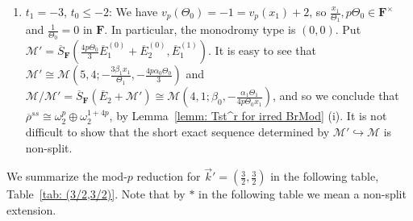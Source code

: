 \documentclass[11pt]{amsart}
\theoremstyle{definition}
\numberwithin{equation}{subsection}
\theoremstyle{plain}
\theoremstyle{plain}
\theoremstyle{plain}
\theoremstyle{plain}
\theoremstyle{plain}
\theoremstyle{plain}
\theoremstyle{plain}
\theoremstyle{plain}
\theoremstyle{plain}
\theoremstyle{plain}
\theoremstyle{plain}
\theoremstyle{plain}
\theoremstyle{definition}
\theoremstyle{definition}
\theoremstyle{definition}
\theoremstyle{remark}
\renewcommand{\(}{\textup{(}}
\renewcommand{\)}{\textup{)}}
\newcommand{\Q}{\mathbf{Q}}
\newcommand{\F}{\mathbf{F}}
\newcommand{\barS}{\overline{S}}
\newcommand{\rhobar}{\overline{\rho}}
\newcommand{\cM}{\mathcal{M}}
\newcommand{\barE}{\overline{E}}
\newcommand{\vk}{\vec{k}}
\newcommand{\IQptwo}{{I_{\Q_{p^2}}}}
\begin{document}
\begin{enumerate}[leftmargin=*]
\begin{enumerate}[leftmargin=*]
        \item Assume $\frac{px_1}{x_0}\neq 1$ in $\F$. Put $\cM'$ as in (iii)(b). By the same isomorphisms for $\cM'$ and $\cM/\cM'$ we have $\rhobar^{ss}|_\IQptwo\cong\omega_2^{1+p}\oplus\omega_2^{4p}$, by Lemma~\ref{lemm: Tst^r for irred BrMod}~(i). It is not difficult to show that the short exact sequence determined by $\cM'\hookrightarrow \cM$ is non-split.
      \end{enumerate}
  \item $t_1=-3$, $t_0\leq -2$: We have $v_p(\Theta_0)=-1=v_p(x_1)+2$, so $\frac{x_1}{\Theta_1},p\Theta_0\in\F^\times$ and $\frac{1}{\Theta_0}=0$ in $\F$. In particular, the monodromy type is $(0,0)$. Put $\cM'=\barS_{\F}(\frac{4p\Theta_0}{3}\barE_1^{(0)}+\barE_2^{(0)},\barE_1^{(1)})$. It is easy to see that $\cM'\cong\cM(5,4;-\frac{3\beta_1x_1}{\Theta_1},-\frac{4p\alpha_0\Theta_0}{3})$ and $\cM/\cM'=\barS_{\F}(\barE_2+\cM')\cong\cM(4,1;\beta_0,-\frac{\alpha_1\Theta_1}{4p\Theta_0x_1})$, and so we conclude that $\rhobar^{ss}\cong\omega_2^p\oplus\omega_2^{1+4p}$, by Lemma~\ref{lemm: Tst^r for irred BrMod} (i). It is not difficult to show that the short exact sequence determined by $\cM'\hookrightarrow \cM$ is non-split.
\end{enumerate}
We summarize the mod-$p$ reduction for $\vk'=(\frac{3}{2},\frac{3}{2})$ in the following table, Table~\ref{tab: (3/2,3/2)}. Note that by $\ast$ in the following table we mean a non-split extension.
\end{document}
